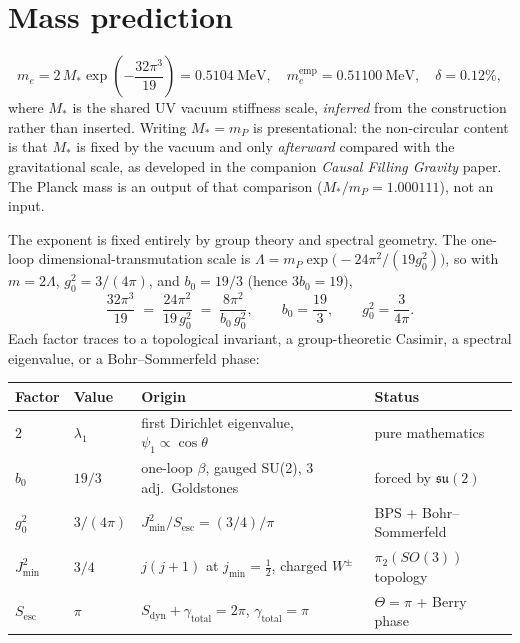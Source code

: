 \documentclass[12pt]{article}
\theoremstyle{definition}
\theoremstyle{remark}
\begin{document}
\section{Mass prediction}
\label{sec:mass}

\begin{equation}
\boxed{m_e=2\,M_*\exp\!\left(-\frac{32\pi^3}{19}\right)
=0.5104\ \mathrm{MeV},\quad m_e^{\mathrm{emp}}=0.51100\ \mathrm{MeV},
\quad \delta=0.12\%,}
\label{eq:massfinal}
\end{equation}
where $M_*$ is the shared UV vacuum stiffness scale, \emph{inferred} from
the construction rather than inserted. Writing $M_*=m_P$ is presentational:
the non-circular content is that $M_*$ is fixed by the vacuum and only
\emph{afterward} compared with the gravitational scale, as developed in the
companion \emph{Causal Filling Gravity} paper. The Planck mass is an output
of that comparison ($M_*/m_P=1.000111$), not an input.

\medskip
The exponent is fixed entirely by group theory and spectral geometry. The
one-loop dimensional-transmutation scale is
$\Lambda=m_P\exp\!\bigl(-24\pi^2/(19g_0^2)\bigr)$, so with $m=2\Lambda$,
$g_0^2=3/(4\pi)$, and $b_0=19/3$ (hence $3b_0=19$),
\begin{equation}
\frac{32\pi^3}{19}\;=\;\frac{24\pi^2}{19\,g_0^2}\;=\;\frac{8\pi^2}{b_0\,g_0^2},
\qquad b_0=\frac{19}{3},\qquad g_0^2=\frac{3}{4\pi}.
\label{eq:expforced}
\end{equation}
Each factor traces to a topological invariant, a group-theoretic Casimir, a
spectral eigenvalue, or a Bohr--Sommerfeld phase:

\medskip
\begin{center}
{\small
\begin{tabular}{llll}\toprule
Factor & Value & Origin & Status\\\midrule
$2$ & $\lambda_1$ & first Dirichlet eigenvalue, $\psi_1\propto\cos\theta$ & pure mathematics\\
$b_0$ & $19/3$ & one-loop $\beta$, gauged SU(2), 3 adj.\ Goldstones & forced by $\mathfrak{su}(2)$\\
$g_0^2$ & $3/(4\pi)$ & $J_{\min}^2/S_{\mathrm{esc}}=(3/4)/\pi$ & BPS + Bohr--Sommerfeld\\
$J_{\min}^2$ & $3/4$ & $j(j{+}1)$ at $j_{\min}=\tfrac12$, charged $W^\pm$ & $\pi_2(SO(3))$ topology\\
$S_{\mathrm{esc}}$ & $\pi$ & $S_{\mathrm{dyn}}+\gamma_{\mathrm{total}}=2\pi$, $\gamma_{\mathrm{total}}=\pi$ & $\Theta=\pi$ + Berry phase\\\bottomrule
\end{tabular}}
\end{center}
\end{document}
